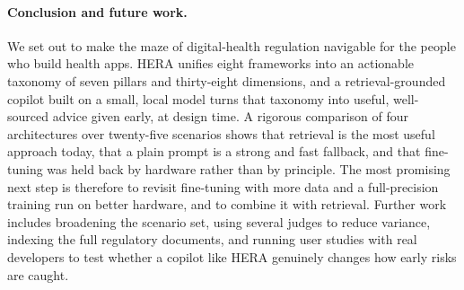 \documentclass[11pt]{article}
\begin{document}
\paragraph{Conclusion and future work.}
We set out to make the maze of digital-health regulation navigable for the people who
build health apps. HERA unifies eight frameworks into an actionable taxonomy of seven
pillars and thirty-eight dimensions, and a retrieval-grounded copilot built on a small,
local model turns that taxonomy into useful, well-sourced advice given early, at design
time. A rigorous comparison of four architectures over twenty-five scenarios shows that
retrieval is the most useful approach today, that a plain prompt is a strong and fast
fallback, and that fine-tuning was held back by hardware rather than by principle. The most
promising next step is therefore to revisit fine-tuning with more data and a full-precision
training run on better hardware, and to combine it with retrieval. Further work includes
broadening the scenario set, using several judges to reduce variance, indexing the full
regulatory documents, and running user studies with real developers to test whether a
copilot like HERA genuinely changes how early risks are caught.

\end{document}

